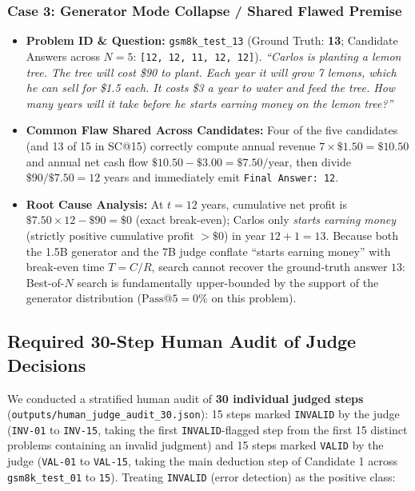 \documentclass[10pt,a4paper]{article}
\begin{document}
\subsubsection*{Case 3: Generator Mode Collapse / Shared Flawed Premise}
\begin{itemize}
    \item \textbf{Problem ID \& Question:} \texttt{gsm8k\_test\_13} (Ground Truth: \textbf{13}; Candidate Answers across $N=5$: \texttt{[12, 12, 11, 12, 12]}). \textit{``Carlos is planting a lemon tree. The tree will cost \$90 to plant. Each year it will grow 7 lemons, which he can sell for \$1.5 each. It costs \$3 a year to water and feed the tree. How many years will it take before he starts earning money on the lemon tree?''}
    \item \textbf{Common Flaw Shared Across Candidates:} Four of the five candidates (and 13 of 15 in SC@15) correctly compute annual revenue $7 \times \$1.50 = \$10.50$ and annual net cash flow $\$10.50 - \$3.00 = \$7.50/\text{year}$, then divide $\$90 / \$7.50 = 12$ years and immediately emit \texttt{Final Answer: 12}.
    \item \textbf{Root Cause Analysis:} At $t=12$ years, cumulative net profit is $\$7.50 \times 12 - \$90 = \$0$ (exact break-even); Carlos only \textit{starts earning money} (strictly positive cumulative profit $> \$0$) in year $12 + 1 = 13$. Because both the 1.5B generator and the 7B judge conflate ``starts earning money'' with break-even time $T = C / R$, search cannot recover the ground-truth answer $13$: Best-of-$N$ search is fundamentally upper-bounded by the support of the generator distribution ($\text{Pass@5} = 0\%$ on this problem).
\end{itemize}

\subsection{Required 30-Step Human Audit of Judge Decisions}
We conducted a stratified human audit of \textbf{30 individual judged steps} (\texttt{outputs/human\_judge\_audit\_30.json}): 15 steps marked \texttt{INVALID} by the judge (\texttt{INV-01} to \texttt{INV-15}, taking the first \texttt{INVALID}-flagged step from the first 15 distinct problems containing an invalid judgment) and 15 steps marked \texttt{VALID} by the judge (\texttt{VAL-01} to \texttt{VAL-15}, taking the main deduction step of Candidate 1 across \texttt{gsm8k\_test\_01} to \texttt{15}). Treating \texttt{INVALID} (error detection) as the positive class:
\end{document}
